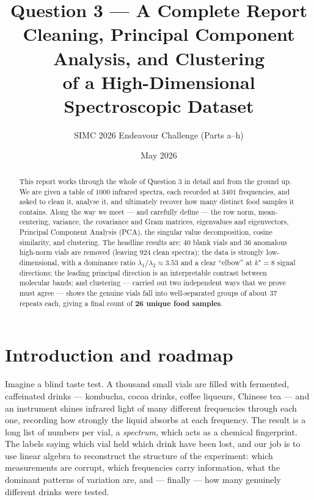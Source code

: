 \documentclass[11pt]{article}
\title{\bfseries Question 3 --- A Complete Report\\[4pt]
\large Cleaning, Principal Component Analysis, and Clustering\\ of a High-Dimensional Spectroscopic Dataset}
\author{SIMC 2026 Endeavour Challenge \quad (Parts a--h)}
\date{May 2026}
\theoremstyle{definition}\newtheorem{definition}{Definition}[section]
\theoremstyle{plain}\newtheorem{proposition}{Proposition}[section]
\theoremstyle{remark}\newtheorem{remark}{Remark}[section]
\begin{document}
\maketitle

\begin{abstract}\noindent
This report works through the whole of Question 3 in detail and from the ground up. We are
given a table of $1000$ infrared spectra, each recorded at $3401$ frequencies, and asked to
clean it, analyse it, and ultimately recover how many distinct food samples it contains. Along
the way we meet --- and carefully define --- the row norm, mean-centering, variance, the
covariance and Gram matrices, eigenvalues and eigenvectors, Principal Component Analysis (PCA),
the singular value decomposition, cosine similarity, and clustering. The headline results are:
$40$ blank vials and $36$ anomalous high-norm vials are removed (leaving $924$ clean spectra);
the data is strongly low-dimensional, with a dominance ratio $\lambda_1/\lambda_2\approx3.53$
and a clear ``elbow'' at $k^\star=8$ signal directions; the leading principal direction is an
interpretable contrast between molecular bands; and clustering --- carried out two independent
ways that we prove must agree --- shows the genuine vials fall into well-separated groups of
about $37$ repeats each, giving a final count of \textbf{26 unique food samples}.
\end{abstract}

\tableofcontents
\bigskip

\section{Introduction and roadmap}\label{sec:intro}

Imagine a blind taste test. A thousand small vials are filled with fermented, caffeinated
drinks --- kombucha, cocoa drinks, coffee liqueurs, Chinese tea --- and an instrument shines
infrared light of many different frequencies through each one, recording how strongly the
liquid absorbs at each frequency. The result is a long list of numbers per vial, a
\emph{spectrum}, which acts as a chemical fingerprint. The labels saying which vial held which
drink have been lost, and our job is to use linear algebra to reconstruct the structure of the
experiment: which measurements are corrupt, which frequencies carry information, what the
dominant patterns of variation are, and --- finally --- how many genuinely different drinks
were tested.
\end{document}
